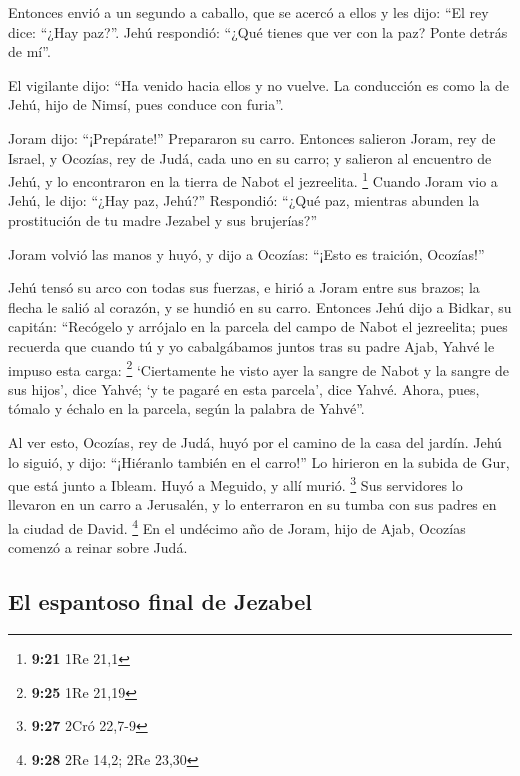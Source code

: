 \begin{paracol}{2}
 Entonces envió a un segundo a caballo, que se acercó a
ellos y les dijo: ``El rey dice: ``¿Hay paz?''. Jehú respondió: ``¿Qué
tienes que ver con la paz? Ponte detrás de mí''.

 El vigilante dijo: ``Ha venido hacia ellos y no vuelve.
La conducción es como la de Jehú, hijo de Nimsí, pues conduce con
furia''.

 Joram dijo: ``¡Prepárate!'' Prepararon su carro.
Entonces salieron Joram, rey de Israel, y Ocozías, rey de Judá, cada uno
en su carro; y salieron al encuentro de Jehú, y lo encontraron en la
tierra de Nabot el jezreelita. \footnote{\textbf{9:21} 1Re 21,1}
 Cuando Joram vio a Jehú, le dijo: ``¿Hay paz, Jehú?''
Respondió: ``¿Qué paz, mientras abunden la prostitución de tu madre
Jezabel y sus brujerías?''

 Joram volvió las manos y huyó, y dijo a Ocozías: ``¡Esto
es traición, Ocozías!''

 Jehú tensó su arco con todas sus fuerzas, e hirió a
Joram entre sus brazos; la flecha le salió al corazón, y se hundió en su
carro.  Entonces Jehú dijo a Bidkar, su capitán:
``Recógelo y arrójalo en la parcela del campo de Nabot el jezreelita;
pues recuerda que cuando tú y yo cabalgábamos juntos tras su padre Ajab,
Yahvé le impuso esta carga: \footnote{\textbf{9:25} 1Re 21,19}
 `Ciertamente he visto ayer la sangre de Nabot y la
sangre de sus hijos', dice Yahvé; `y te pagaré en esta parcela', dice
Yahvé. Ahora, pues, tómalo y échalo en la parcela, según la palabra de
Yahvé''.

 Al ver esto, Ocozías, rey de Judá, huyó por el camino de
la casa del jardín. Jehú lo siguió, y dijo: ``¡Hiéranlo también en el
carro!'' Lo hirieron en la subida de Gur, que está junto a Ibleam. Huyó
a Meguido, y allí murió. \footnote{\textbf{9:27} 2Cró 22,7-9}
 Sus servidores lo llevaron en un carro a Jerusalén, y lo
enterraron en su tumba con sus padres en la ciudad de David. \footnote{\textbf{9:28}
  2Re 14,2; 2Re 23,30}  En el undécimo año de Joram, hijo
de Ajab, Ocozías comenzó a reinar sobre Judá.

\hypertarget{el-espantoso-final-de-jezabel}{%
\subsection{El espantoso final de
Jezabel}\label{el-espantoso-final-de-jezabel}}


\end{paracol}
